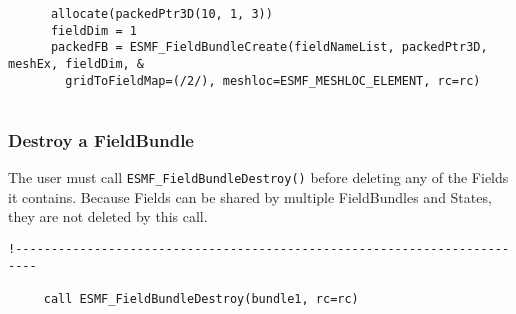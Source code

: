  \begin{verbatim}
      allocate(packedPtr3D(10, 1, 3))
      fieldDim = 1
      packedFB = ESMF_FieldBundleCreate(fieldNameList, packedPtr3D, meshEx, fieldDim, &
        gridToFieldMap=(/2/), meshloc=ESMF_MESHLOC_ELEMENT, rc=rc)
 
\end{verbatim}
 

  \subsubsection{Destroy a FieldBundle}
  
  The user must call {\tt ESMF\_FieldBundleDestroy()} before 
  deleting any of the Fields it contains.  Because Fields
  can be shared by multiple FieldBundles and States, they are
  not deleted by this call. 

 \begin{verbatim}
!-------------------------------------------------------------------------

     call ESMF_FieldBundleDestroy(bundle1, rc=rc)
 
\end{verbatim}

\setlength{\parskip}{\oldparskip}
\setlength{\parindent}{\oldparindent}
\setlength{\baselineskip}{\oldbaselineskip}
